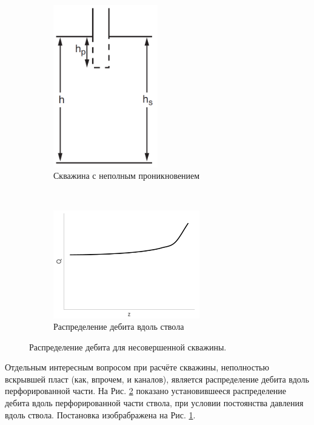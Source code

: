 \begin{figure}[H]

	\begin{subfigure}[b]{0.5\textwidth}
	\centering
	\includegraphics[width=0.5\textwidth]{pic/part_penetrating.png}
	\caption{Скважина с неполным проникновением}
	\label{pic:part_problem}
	\end{subfigure}
~
	\begin{subfigure}[b]{0.5\textwidth}
		\centering
		\includegraphics[width=0.7\textwidth]{pic/rate_distr.png}
		\caption{Распределение дебита вдоль ствола}
		\label{pic:rate_distr}
	\end{subfigure}
	\caption{Распределение дебита для несовершенной скважины.}
	\label{pic:part_pen}
\end{figure}

	Отдельным интересным вопросом при расчёте скважины, неполностью вскрывшей пласт (как, впрочем, и каналов), является распределение дебита вдоль перфорированной части. На Рис. \ref{pic:rate_distr} показано установившееся распределение дебита вдоль перфорированной части ствола, при условии постоянства давления вдоль ствола.
Постановка изобрабражена на Рис. \ref{pic:part_problem}.

